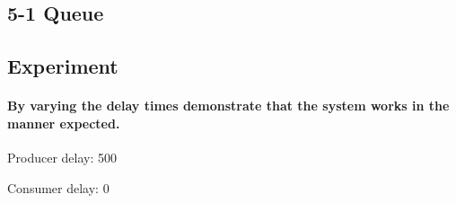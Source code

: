 \subsection{5-1 Queue}

\subsection{Experiment}

\paragraph{By varying the delay times demonstrate that the system works in the manner expected.}


Producer delay: 500

Consumer delay: 0

